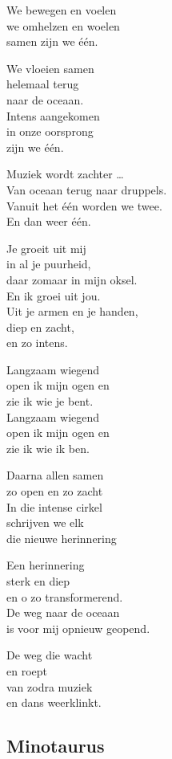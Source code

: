 \documentclass[
  11pt,
]{book}
\begin{document}
We bewegen en voelen\\
we omhelzen en woelen\\
samen zijn we één.

We vloeien samen\\
helemaal terug\\
naar de oceaan.\\
Intens aangekomen\\
in onze oorsprong\\
zijn we één.

Muziek wordt zachter \ldots{}\\
Van oceaan terug naar druppels.\\
Vanuit het één worden we twee.\\
En dan weer één.

Je groeit uit mij\\
in al je puurheid,\\
daar zomaar in mijn oksel.\\
En ik groei uit jou.\\
Uit je armen en je handen,\\
diep en zacht,\\
en zo intens.

Langzaam wiegend\\
open ik mijn ogen en\\
zie ik wie je bent.\\
Langzaam wiegend\\
open ik mijn ogen en\\
zie ik wie ik ben.

Daarna allen samen\\
zo open en zo zacht\\
In die intense cirkel\\
schrijven we elk\\
die nieuwe herinnering

Een herinnering\\
sterk en diep\\
en o zo transformerend.\\
De weg naar de oceaan\\
is voor mij opnieuw geopend.

De weg die wacht\\
en roept\\
van zodra muziek\\
en dans weerklinkt.

\subsection*{Minotaurus}\label{minotaurus}
\end{document}
